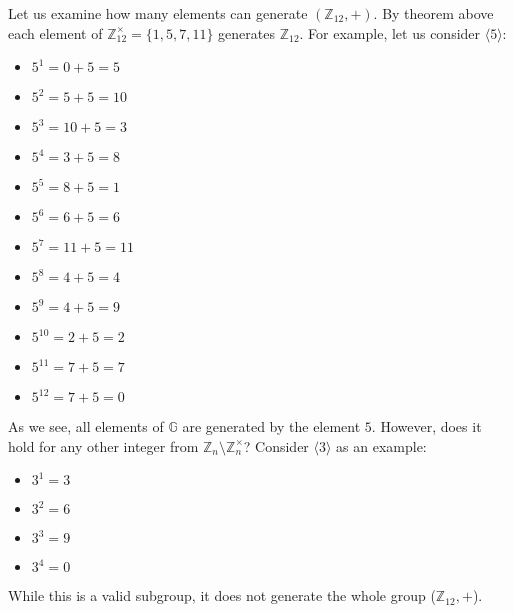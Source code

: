 \documentclass[../lecture-notes-148x210.tex]{subfiles}
\begin{document}
\begin{example}
    Let us examine how many elements can generate $(\mathbb{Z}_{12}, +)$. By
    theorem above each element of $\mathbb{Z}_{12}^{\times} = \{1, 5, 7, 11\}$
    generates $\mathbb{Z}_{12}$. For example, let us consider $\langle 5
    \rangle$:
    \begin{xmulticols}{3}
        \begin{itemize}
            \item $5^{1} = 0 + 5 = 5$
            \item $5^{2} = 5 + 5 = 10$
            \item $5^{3} = 10 + 5 = 3$
            \item $5^{4} = 3  + 5 = 8$
            
            \item $5^{5} = 8 + 5 = 1$
            \item $5^{6} = 6 + 5 = 6$
            \item $5^{7} = 11 + 5 = 11$
            \item $5^{8} = 4 + 5 = 4$
            
            \item $5^{9} = 4 + 5= 9$
            \item $5^{10} = 2 + 5 = 2$
            \item $5^{11} = 7 + 5 = 7$
            \item $5^{12} = 7 + 5 = 0$
        \end{itemize}        
    \end{xmulticols}

    As we see, all elements of $\mathbb{G}$ are generated by the element $5$.
    However, does it hold for any other integer from $\mathbb{Z}_n \setminus
    \mathbb{Z}_n^{\times}$? Consider $\langle 3 \rangle$ as an example:
    \begin{xmulticols}{4}
        \begin{itemize}
            \item $3^{1} = 3$
            \item $3^{2} = 6$
            \item $3^{3} = 9$
            \item $3^{4} = 0$
        \end{itemize}
    \end{xmulticols} 

    While this is a valid subgroup, it does not generate the whole group
    ($\mathbb{Z}_{12}, +$).
\end{example}
\end{document}
